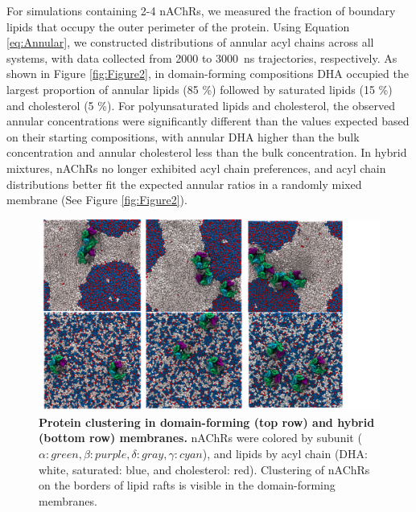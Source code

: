 For simulations containing 2-4 nAChRs, we measured the fraction of boundary lipids that occupy the outer perimeter of the protein. Using Equation \ref{eq:Annular}, we constructed distributions of annular acyl chains across all systems, with data collected from 2000 to 3000~ns trajectories, respectively. As shown in Figure \ref{fig:Figure2}, in domain-forming compositions DHA occupied the largest proportion of annular lipids (85 \%) followed by saturated lipids (15 \%) and cholesterol (5 \%). For polyunsaturated lipids and cholesterol, the observed annular concentrations were significantly different than the values expected based on their starting compositions, with annular DHA higher than the bulk concentration and annular cholesterol less than the bulk concentration.  In hybrid mixtures, nAChRs no longer exhibited acyl chain preferences, and acyl chain distributions better fit the expected annular ratios in a randomly mixed membrane (See Figure \ref{fig:Figure2}).

\begin{figure}[h]
\center
\includegraphics[width=\linewidth,trim={0cm 0cm 0cm 0cm}]{Figure3}
\caption[Protein clustering in domain-forming (top row) and hybrid (bottom row) membranes.]{{\bf Protein clustering in domain-forming (top row) and hybrid (bottom row) membranes.} nAChRs were colored by subunit ($\alpha:green,\beta:purple,\delta:gray,\gamma:cyan$), and lipids by acyl chain (DHA: white, saturated: blue, and cholesterol: red). Clustering of nAChRs on the borders of lipid rafts is visible in the domain-forming membranes.}
\label{fig:Figure4}
\end{figure}



